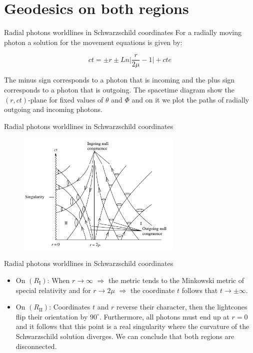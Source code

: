 \documentclass[xcolor=dvipsnames]{beamer}
\begin{document}
\section{Geodesics on both regions}
\begin{frame}{Radial photons worldlines in Schwarzschild coordinates}
For a radially moving photon a solution for the movement equations is given by:

\begin{equation}
ct=\pm r\pm Ln\Big| \frac{r}{2\mu}-1 \Big|+cte \label{2}
\end{equation}

The minus sign corresponds to a photon that is incoming and the plus sign corresponds to a photon that is outgoing. The spacetime diagram show the $(r,ct)$-plane for fixed values of $\theta$ and $\Phi$ and on it we plot the paths of radially outgoing and incoming photons.

\end{frame}
\begin{frame}{Radial photons worldlines in Schwarzschild coordinates}

\begin{figure}
    \centering
    \includegraphics[width=0.7\textwidth]{Presentations/Images/4_bhphotons.png}
\end{figure}
\end{frame}

\begin{frame}{Radial photons worldlines in Schwarzschild coordinates}
\begin{itemize}
    \item On $(R_{\mathrm{I}})$: When $r\rightarrow \infty$ $\Rightarrow$ the metric tends to the Minkowski metric of special relativity and for $r\rightarrow 2\mu$ $\Rightarrow$ the coordinate $t$ follows that $t\rightarrow \pm\infty$.\\
    
    \item On $(R_{\mathrm{II}})$: Coordinates $t$ and $r$ reverse their character, then the lightcones flip their orientation by $90^{\circ}$. Furthermore, all photons must end up at $r=0$ and it follows that this point is a real singularity where the curvature of the Schwarzschild solution diverges. We can conclude that both regions are disconnected.
\end{itemize}
\end{frame}
\end{document}
